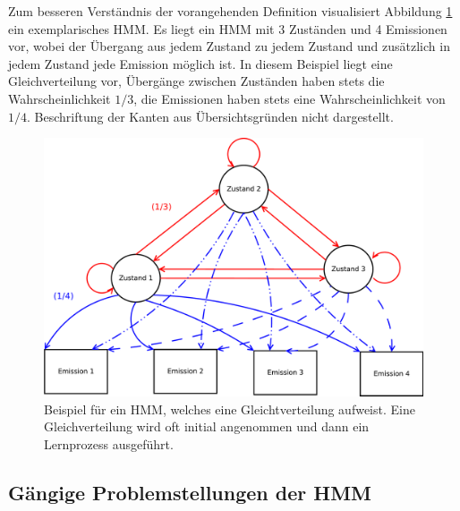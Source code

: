 Zum besseren Verständnis der vorangehenden Definition visualisiert Abbildung \ref{fig:hmm} ein exemplarisches HMM. Es liegt ein HMM mit 3 Zuständen und 4 Emissionen vor, wobei der Übergang aus jedem Zustand zu jedem Zustand und zusätzlich in jedem Zustand jede Emission möglich ist.
In diesem Beispiel liegt eine Gleichverteilung vor, Übergänge zwischen Zuständen haben stets die Wahrscheinlichkeit $1/3$, die Emissionen haben stets eine Wahrscheinlichkeit von $1/4$.
Beschriftung der Kanten aus Übersichtsgründen nicht dargestellt.
\begin{figure}[H]
	\centering
	\includegraphics[width=1\textwidth]{bilder/02_hmm.pdf}
	\caption{Beispiel für ein HMM, welches eine Gleichtverteilung aufweist. Eine Gleichverteilung wird oft initial angenommen und dann ein Lernprozess ausgeführt.}
	\label{fig:hmm}
\end{figure}

\subsection{Gängige Problemstellungen der HMM}
\label{sec:standartalgorithmenHMM}

